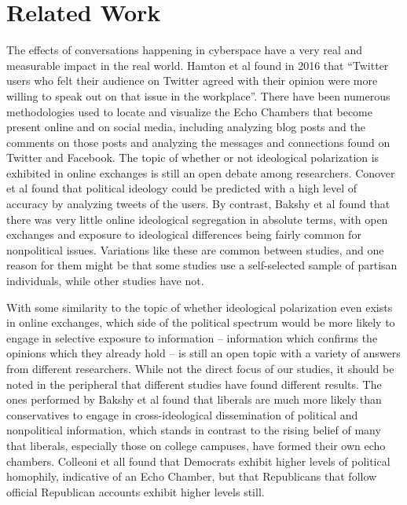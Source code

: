 \documentclass[journal]{IEEEtran}
\begin{document}
	\section{Related Work}
	
	The effects of conversations happening in cyberspace have a very real and measurable impact in the real world. Hamton et al found in 2016 that “Twitter users who felt their audience on Twitter agreed with their opinion were more willing to speak out on that issue in the workplace”. There have been numerous methodologies used to locate and visualize the Echo Chambers that become present online and on social media, including analyzing blog posts and the comments on those posts and analyzing the messages and connections found on Twitter and Facebook. The topic of whether or not ideological polarization is exhibited in online exchanges is still an open debate among researchers. Conover et al found that political ideology could be predicted with a high level of accuracy by analyzing tweets of the users. By contrast, Bakshy et al found that there was very little online ideological segregation in absolute terms, with open exchanges and exposure to ideological differences being fairly common for nonpolitical issues. Variations like these are common between studies, and one reason for them might be that some studies use a self-selected sample of partisan individuals, while other studies have not. 
	
	With some similarity to the topic of whether ideological polarization even exists in online exchanges, which side of the political spectrum would be more likely to engage in selective exposure to information -- information which confirms the opinions which they already hold -- is still an open topic with a variety of answers from different researchers. While not the direct focus of our studies, it should be noted in the peripheral that different studies have found different results. The ones performed by Bakshy et al found that liberals are much more likely than conservatives to engage in cross-ideological dissemination of political and nonpolitical information, which stands in contrast to the rising belief of many that liberals, especially those on college campuses, have formed their own echo chambers. Colleoni et all found that Democrats exhibit higher levels of political homophily, indicative of an Echo Chamber, but that Republicans that follow official Republican accounts exhibit higher levels still.
	
\end{document}
